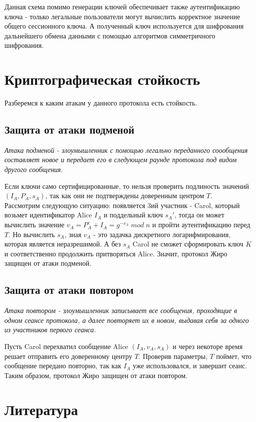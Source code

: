 \documentclass[a4paper]{article}
\begin{document}
Данная схема помимо генерации ключей обеспечивает также аутентификацию ключа - только легальные пользователи могут вычислить корректное значение общего сессионного ключа.
А полученный ключ используется для шифрования дальнейшего обмена данными с помощью алгоритмов симметричного шифрования.

\section{Криптографическая стойкость}
Разберемся к каким атакам у данного протокола есть стойкость.
\subsection{Защита от атаки подменой}
\textit{Атака подменой - злоумышленник с помощью легально переданного соообщения составляет новое и передает его в следующем раунде протокола под видом другого сообщения}.
\\
\par 
Если ключи само сертифицированные, то нельзя проверить подлиность значений $(I_A, P_A, s_A)$, так как они не подтверждены доверенным центром $T$.\\
Рассмотрим следующую ситуацию: появляется 3ий участник - Carol, который возьмет идентификатор Alice $I_A$ и поддельный ключ $s_A'$, тогда он может вычислить значение $v_A = P_A^e + I_A = g^{-s_A} \; mod \; n$  и пройти аутентификацию перед $T$. Но вычислить $s_A$, зная $v_A$ -  это задачка дискретного логарифмирования, которая является неразрешимой.
А без $s_A$ Carol не сможет сформировать ключ $K$ и соответственно продолжить притворяться Alice. Значит, протокол Жиро защищен от атаки подменой.
\subsection{Защита от атаки повтором}

\textit{Атака повтором - злоумышленник записывает все сообщения, проходящие в одном сеансе протокола, а далее повторяет их в новом, выдавая себя за одного из участников первого сеанса.}
\\
\par Пусть Carol перехватил сообщение Alice $(I_A, v_A, s_A)$ и через некоторе время решает отправить его доверенному центру $T$. 
Проверив параметры, $T$ поймет, что сообщение передано повторно, так как $I_A$ уже использовался, и завершит сеанс. Таким образом, протокол Жиро защищен от атаки повтором.
\section{Литература}
\end{document}
